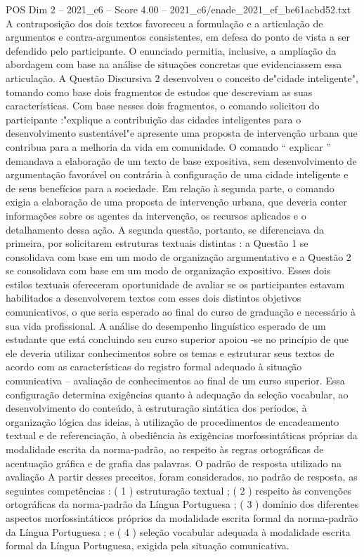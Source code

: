 \begin{textsample}{POS Dim 2 – 2021\_c6 – Score 4.00 – 2021\_c6/enade\_2021\_ef\_be61acbd52.txt}
A contraposição dos dois textos favoreceu a formulação e a articulação de argumentos e contra-argumentos consistentes, em defesa do ponto de vista a ser defendido pelo participante.
O enunciado permitia, inclusive, a ampliação da abordagem com base na análise de situações concretas que evidenciassem essa articulação.
A Questão Discursiva 2 desenvolveu o conceito de"cidade inteligente", tomando como base dois fragmentos de estudos que descreviam as suas características.
Com base nesses dois fragmentos, o comando solicitou do participante :"explique a contribuição das cidades inteligentes para o desenvolvimento sustentável"e apresente uma proposta de intervenção urbana que contribua para a melhoria da vida em comunidade.
O comando “ explicar ” demandava a elaboração de um texto de base expositiva, sem desenvolvimento de argumentação favorável ou contrária à configuração de uma cidade inteligente e de seus benefícios para a sociedade.
Em relação à segunda parte, o comando exigia a elaboração de uma proposta de intervenção urbana, que deveria conter informações sobre os agentes da intervenção, os recursos aplicados e o detalhamento dessa ação.
A segunda questão, portanto, se diferenciava da primeira, por solicitarem estruturas textuais distintas : a Questão 1 se consolidava com base em um modo de organização argumentativo e a Questão 2 se consolidava com base em um modo de organização expositivo.
Esses dois estilos textuais ofereceram oportunidade de avaliar se os participantes estavam habilitados a desenvolverem textos com esses dois distintos objetivos comunicativos, o que seria esperado ao final do curso de graduação e necessário à sua vida profissional.
A análise do desempenho linguístico esperado de um estudante que está concluindo seu curso superior apoiou -se no princípio de que ele deveria utilizar conhecimentos sobre os temas e estruturar seus textos de acordo com as características do registro formal adequado à situação comunicativa – avaliação de conhecimentos ao final de um curso superior.
Essa configuração determina exigências quanto à adequação da seleção vocabular, ao desenvolvimento do conteúdo, à estruturação sintática dos períodos, à organização lógica das ideias, à utilização de procedimentos de encadeamento textual e de referenciação, à obediência às exigências morfossintáticas próprias da modalidade escrita da norma-padrão, ao respeito às regras ortográficas de acentuação gráfica e de grafia das palavras.
O padrão de resposta utilizado na avaliação A partir desses preceitos, foram considerados, no padrão de resposta, as seguintes competências : ( 1 ) estruturação textual ; ( 2 ) respeito às convenções ortográficas da norma-padrão da Língua Portuguesa ; ( 3 ) domínio dos diferentes aspectos morfossintáticos próprios da modalidade escrita formal da norma-padrão da Língua Portuguesa ; e ( 4 ) seleção vocabular adequada à modalidade escrita formal da Língua Portuguesa, exigida pela situação comunicativa.

\end{textsample}
